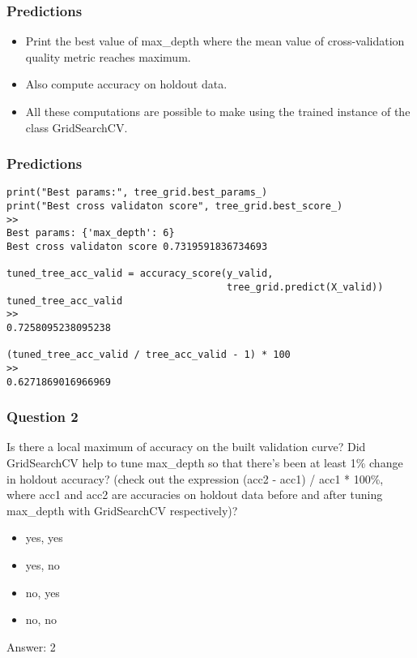 \begin{frame}[fragile]\frametitle{Predictions}
\begin{itemize}
\item Print the best value of max\_depth where the mean value of cross-validation quality metric reaches maximum. 
\item Also compute accuracy on holdout data. 
\item All these computations are possible to make using the trained instance of the class GridSearchCV.
\end{itemize}

\end{frame}

\begin{frame}[fragile]\frametitle{Predictions}
\begin{lstlisting}
print("Best params:", tree_grid.best_params_)
print("Best cross validaton score", tree_grid.best_score_)
>>
Best params: {'max_depth': 6}
Best cross validaton score 0.7319591836734693

tuned_tree_acc_valid = accuracy_score(y_valid, 
                                      tree_grid.predict(X_valid))
tuned_tree_acc_valid
>>
0.7258095238095238

(tuned_tree_acc_valid / tree_acc_valid - 1) * 100
>>
0.6271869016966969

\end{lstlisting}
\end{frame}


\begin{frame}[fragile]\frametitle{Question 2}
Is there a local maximum of accuracy on the built validation curve? 
Did GridSearchCV help to tune max\_depth so that there's been at least 1\% change in holdout accuracy? (check out the expression (acc2 - acc1) / acc1 * 100\%, where acc1 and acc2 are accuracies on holdout data before and after tuning max\_depth with GridSearchCV respectively)?

\begin{itemize}
\item yes, yes
\item yes, no
\item no, yes
\item no, no
\end{itemize}

Answer: 2
\end{frame}

